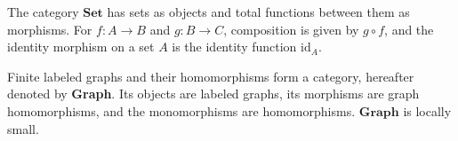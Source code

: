 \begin{example}
The category \(\mathbf{Set}\) has sets as objects and total functions between them as morphisms. For \(f\mathop{\colon} A \mathop{\to} B\) and \(g\mathop{\colon} B \mathop{\to} C\), composition is given by \(g\circ f\), and the identity morphism on a set \(A\) is the identity function \(\mathrm{id}_A\).
\end{example}

\begin{example} 
    Finite labeled graphs and their homomorphisms form a category, hereafter denoted by \textbf{Graph}. Its objects are labeled graphs, its morphisms are graph homomorphisms, and the monomorphisms are homomorphisms. 
    $\textbf{Graph}$ is locally small. 
\end{example}

 
